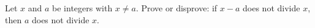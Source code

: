 Let $x$ and $a$ be integers with $x\ne a$. Prove or disprove: if $x-a$ does not divide $x$, then $a$ does not divide $x$.
